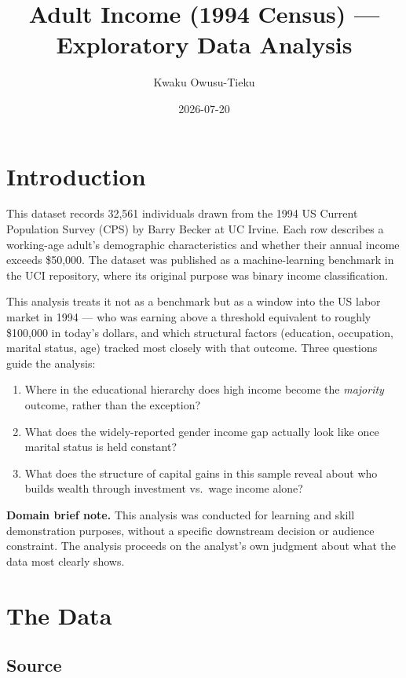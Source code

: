 \documentclass[
  letterpaper,
  DIV=11,
  numbers=noendperiod]{scrartcl}
\title{Adult Income (1994 Census) --- Exploratory Data Analysis}
\author{Kwaku Owusu-Tieku}
\date{2026-07-20}
\providecommand{\tightlist}{%
  \setlength{\itemsep}{0pt}\setlength{\parskip}{0pt}}\usepackage{longtable,booktabs,array}
\begin{document}
\maketitle


\section{Introduction}\label{introduction}

This dataset records 32,561 individuals drawn from the 1994 US Current
Population Survey (CPS) by Barry Becker at UC Irvine. Each row describes
a working-age adult's demographic characteristics and whether their
annual income exceeds \$50,000. The dataset was published as a
machine-learning benchmark in the UCI repository, where its original
purpose was binary income classification.

This analysis treats it not as a benchmark but as a window into the US
labor market in 1994 --- who was earning above a threshold equivalent to
roughly \$100,000 in today's dollars, and which structural factors
(education, occupation, marital status, age) tracked most closely with
that outcome. Three questions guide the analysis:

\begin{enumerate}
\def\labelenumi{\arabic{enumi}.}
\tightlist
\item
  Where in the educational hierarchy does high income become the
  \emph{majority} outcome, rather than the exception?
\item
  What does the widely-reported gender income gap actually look like
  once marital status is held constant?
\item
  What does the structure of capital gains in this sample reveal about
  who builds wealth through investment vs.~wage income alone?
\end{enumerate}

\textbf{Domain brief note.} This analysis was conducted for learning and
skill demonstration purposes, without a specific downstream decision or
audience constraint. The analysis proceeds on the analyst's own judgment
about what the data most clearly shows.

\section{The Data}\label{the-data}

\subsection{Source}\label{source}
\end{document}
